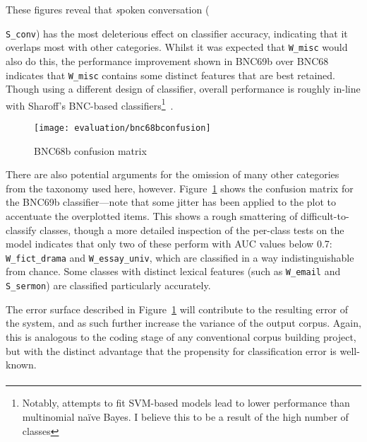 These figures reveal that {\textsl spoken conversation} ({\texttt{S\_conv}) has the most deleterious effect on classifier accuracy, indicating that it overlaps most with other categories.  Whilst it was expected that \texttt{W\_misc} would also do this, the performance improvement shown in BNC69b over BNC68 indicates that \texttt{W\_misc} contains some distinct features that are best retained.  Though using a different design of classifier, overall performance is roughly in-line with Sharoff's BNC-based classifiers\footnote{Notably, attempts to fit SVM-based models lead to lower performance than multinomial na\"ive Bayes.  I believe this to be a result of the high number of classes}~\cite[ibid.]{sharoff2007classifying}.
    

\begin{figure}[hp]
    \centering
    \texttt{[image: evaluation/bnc68bconfusion]}
    \caption{BNC68b confusion matrix}
    \label{fig:evaluation:heuristics:bnc68bconfusion}
\end{figure}



There are also potential arguments for the omission of many other categories from the taxonomy used here, however.  Figure~\ref{fig:evaluation:heuristics:bnc68bconfusion} shows the confusion matrix for the BNC69b classifier---note that some jitter has been applied to the plot to accentuate the overplotted items.  This shows a rough smattering of difficult-to-classify classes, though a more detailed inspection of the per-class tests on the model indicates that only two of these perform with AUC values below 0.7: \texttt{W\_fict\_drama} and \texttt{W\_essay\_univ}, which are classified in a way indistinguishable from chance.  Some classes with distinct lexical features (such as \texttt{W\_email} and \texttt{S\_sermon}) are classified particularly accurately.

The error surface described in Figure~\ref{fig:evaluation:heuristics:bnc68bconfusion} will contribute to the resulting error of the system, and as such further increase the variance of the output corpus.  Again, this is analogous to the coding stage of any conventional corpus building project, but with the distinct advantage that the propensity for classification error is well-known.


\paragraph{}

}
